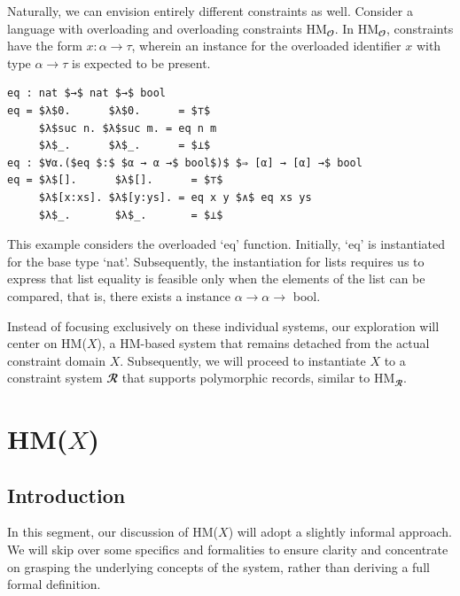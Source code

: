 \documentclass[runningheads]{llncs}
\newcommand{\hmx}{HM($X$)}
\begin{document}
Naturally, we can envision entirely different constraints as well.
Consider a language with overloading and overloading constraints
HM$_𝓞$\cite{syso}.
In HM$_𝓞$, constraints have the form $x : α → τ$,
wherein an instance for the overloaded identifier $x$ with type $α → τ$ is
expected to be present.
\begin{example}
  \begin{lstlisting}
eq : nat $→$ nat $→$ bool
eq = $λ$0.      $λ$0.      = $⊤$
     $λ$suc n. $λ$suc m. = eq n m 
     $λ$_.      $λ$_.      = $⊥$
eq : $∀α.($eq $:$ $α → α →$ bool$)$ $⇒ [α] → [α] →$ bool
eq = $λ$[].      $λ$[].      = $⊤$
     $λ$[x:xs]. $λ$[y:ys]. = eq x y $∧$ eq xs ys
     $λ$_.       $λ$_.       = $⊥$
  \end{lstlisting}
\end{example}
This example considers the overloaded `eq' function.
Initially, `eq' is instantiated for the base type `nat'.
Subsequently, the instantiation for lists requires us to express that list
equality is feasible only when
the elements of the list can be compared, that is, there exists a instance $α →
  α →$ bool.

Instead of focusing exclusively on these individual systems, our exploration
will center on \hmx{}, a HM-based system that remains detached from
the actual constraint domain $X$.
Subsequently, we will proceed to instantiate $X$ to a constraint system $𝓡$
that supports polymorphic records, similar to HM${_𝓡}$.

\section{\hmx{}}

\subsection{Introduction}
In this segment, our discussion of \hmx{} will adopt a slightly informal
approach.
We will skip over some specifics and formalities to ensure clarity and
concentrate on
grasping the underlying concepts of the system, rather than deriving a full
formal definition.
\end{document}

